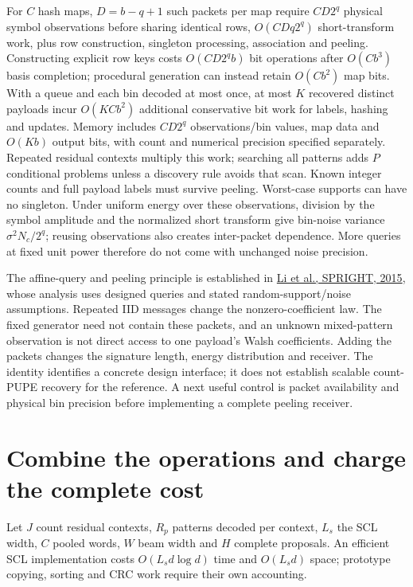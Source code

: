 \documentclass[10pt,a4paper]{article}
\begin{document}
For $C$ hash maps, $D=b-q+1$ such packets per map require $CD2^q$ physical symbol observations
before sharing identical rows, $O(CDq2^q)$ short-transform work, plus row construction, singleton
processing, association and peeling. Constructing explicit row keys costs $O(CD2^q b)$ bit operations
after $O(Cb^3)$ basis completion; procedural generation can instead retain $O(Cb^2)$ map bits.
With a queue and each bin decoded at most once, at most $K$ recovered distinct payloads incur
$O(KCb^2)$ additional conservative bit work for labels, hashing and updates. Memory includes
$CD2^q$ observations/bin values, map data and $O(Kb)$ output bits, with count and numerical precision
specified separately. Repeated residual contexts multiply this work; searching all patterns adds $P$
conditional problems unless a discovery rule avoids that scan. Known integer counts and full payload
labels must survive peeling.
Worst-case supports can have no singleton. Under uniform energy over these observations, division by
the symbol amplitude and the normalized short transform give bin-noise variance
$\sigma^2N_c/2^q$; reusing observations also creates inter-packet dependence. More queries at fixed
unit power therefore do not come with unchanged noise precision.

The affine-query and peeling principle is established in
\href{https://arxiv.org/abs/1508.06336}{Li et al., SPRIGHT, 2015}, whose analysis uses designed
queries and stated random-support/noise assumptions. Repeated IID messages change the nonzero-coefficient
law. The fixed generator need not contain these packets, and an unknown mixed-pattern observation
is not direct access to one payload's Walsh
coefficients. Adding the packets changes the signature length, energy distribution and receiver.
The identity identifies a concrete design interface; it does not establish scalable count-PUPE recovery
for the reference. A next useful control is packet availability and physical bin precision before
implementing a complete peeling receiver.

\section{Combine the operations and charge the complete cost}
Let $J$ count residual contexts, $R_p$ patterns decoded per context, $L_s$ the SCL width, $C$ pooled words,
$W$ beam width and $H$ complete proposals. An efficient SCL implementation costs $O(L_sd\log d)$ time
and $O(L_sd)$ space\cite{tal}; prototype copying, sorting and CRC work require their own accounting.
\end{document}
